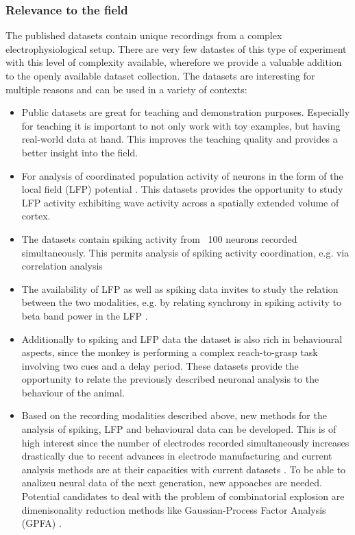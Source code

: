 \subsubsection{Relevance to the field}
The published datasets contain unique recordings from a complex electrophysiological setup. There are very few datastes of this type of experiment with this level of complexity available, wherefore we provide a valuable addition to the openly available dataset collection. The datasets are interesting for multiple reasons and can be used in a variety of contexts:
\begin{itemize}
 \item Public datasets are great for teaching and demonstration purposes. Especially for teaching it is important to not only work with toy examples, but having real-world data at hand. This improves the teaching quality and provides a better insight into the field.
 \item For analysis of coordinated population activity of neurons in the form of the local field (LFP) potential \citep{Mitzdorf_1985, Logothetis_2004, Einevoll_2013}. This datasets provides the opportunity to study LFP activity exhibiting wave activity across a spatially extended volume of cortex\citep{Denker_2018}.
 \item The datasets contain spiking activity from ~100 neurons recorded simultaneously. This permits analysis of spiking activity coordination, e.g. via correlation analysis \citep{Torre_2016, Torre_2016a, Quaglio_2017, Quaglio_2018}
 \item The availability of LFP as well as spiking data invites to study the relation between the two modalities, e.g. by relating synchrony in spiking activity to beta band power in the LFP \citep{Denker_2011}.
 \item Additionally to spiking and LFP data the dataset is also rich in behavioural aspects, since the monkey is performing a complex reach-to-grasp task involving two cues and a delay period. These datasets provide the opportunity to relate the previously described neuronal analysis to the behaviour of the animal.
 \item Based on the recording modalities described above, new methods for the analysis of spiking, LFP and behavioural data can be developed. This is of high interest since the number of electrodes recorded simultaneously increases drastically due to recent advances in electrode manufacturing and current analysis methods are at their capacities with current datasets \citep{Seo_2015,Jun_2017}. To be able to analizeu neural data of the next generation, new appoaches are needed. Potential candidates to deal with the problem of combinatorial explosion are dimenisonality reduction methods like Gaussian-Process Factor Analysis (GPFA) \citep{Yu_2009}. 

\end{itemize}
